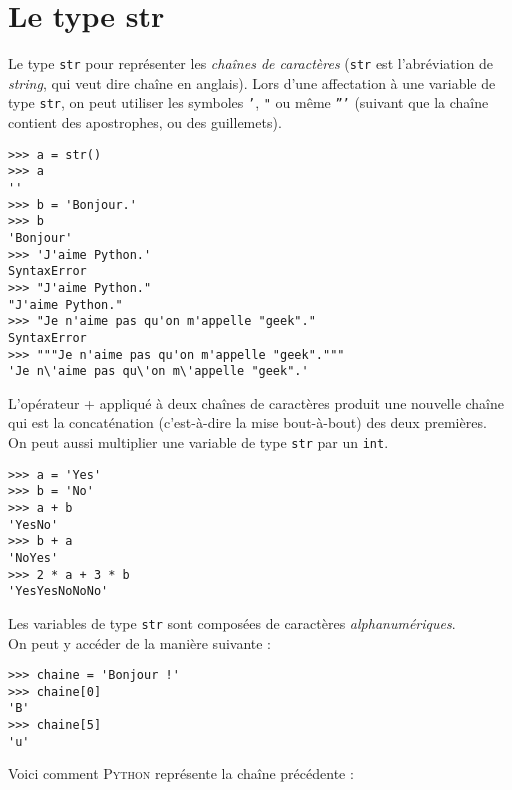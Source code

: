 \section{Le type str}

Le type \texttt{str} pour représenter les \textit{chaînes de caractères} (\texttt{str} est l'abréviation de \emph{string}, qui veut dire chaîne en anglais).
Lors d'une affectation à une variable de type \texttt{str}, on peut utiliser les symboles \texttt{'}, \texttt{"} ou même \texttt{'''} (suivant que la chaîne contient
des apostrophes, ou des guillemets).

\begin{pys}\begin{verbatim}
>>> a = str()
>>> a
''
>>> b = 'Bonjour.'
>>> b
'Bonjour'
>>> 'J'aime Python.'
SyntaxError
>>> "J'aime Python."
"J'aime Python."
>>> "Je n'aime pas qu'on m'appelle "geek"."
SyntaxError
>>> """Je n'aime pas qu'on m'appelle "geek"."""
'Je n\'aime pas qu\'on m\'appelle "geek".'
\end{verbatim}
\end{pys}

L'opérateur + appliqué à deux chaînes de caractères produit une nouvelle chaîne qui est la concaténation (c'est-à-dire la mise bout-à-bout) des deux premières.\\

On peut aussi multiplier une variable de type \texttt{str} par un \texttt{int}.\\

\begin{pys}\begin{verbatim}
>>> a = 'Yes'
>>> b = 'No'
>>> a + b
'YesNo'
>>> b + a
'NoYes'
>>> 2 * a + 3 * b
'YesYesNoNoNo'
\end{verbatim}
\end{pys}

Les variables de type \texttt{str} sont composées de caractères \emph{alphanumériques}.\\ On peut y accéder de la manière suivante :

\begin{pys}\begin{verbatim}
>>> chaine = 'Bonjour !'
>>> chaine[0]
'B'
>>> chaine[5]
'u'
\end{verbatim}
\end{pys}

Voici comment \textsc{Python} représente  la chaîne précédente :

